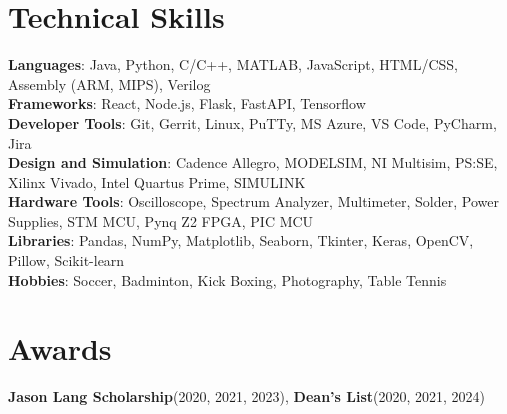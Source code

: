 \documentclass[A4,10pt]{article}
\newcommand{\resumeItem}[1]{
  \item\small{
    {#1 \vspace{-2pt}}
  }
}
\newcommand{\resumeItemListStart}{\begin{itemize}}
\newcommand{\resumeItemListEnd}{\end{itemize}\vspace{-5pt}}
\begin{document}
\section{Technical Skills}
 \begin{itemize}[leftmargin=0.15in, label={}]
    \small{\item{
     \textbf{Languages}{: Java, Python, C/C++, MATLAB, JavaScript, HTML/CSS, Assembly (ARM, MIPS), Verilog} \\
     \textbf{Frameworks}{: React, Node.js, Flask, FastAPI, Tensorflow} \\
     \textbf{Developer Tools}{: Git, Gerrit, Linux, PuTTy, MS Azure, VS Code, PyCharm, Jira} \\
     \textbf{Design and Simulation}{: Cadence Allegro, MODELSIM, NI Multisim, PS:SE, Xilinx Vivado, Intel Quartus Prime, SIMULINK}\\
     \textbf{Hardware Tools}{: Oscilloscope, Spectrum Analyzer, Multimeter, Solder, Power Supplies, STM MCU, Pynq Z2 FPGA, PIC MCU}\\
     \textbf{Libraries}{: Pandas, NumPy, Matplotlib, Seaborn, Tkinter, Keras, OpenCV, Pillow, Scikit-learn}\\
     \textbf{Hobbies}{: Soccer, Badminton, Kick Boxing, Photography, Table Tennis}\\
    }}
 \end{itemize}

\section{Awards}
 \begin{itemize}[leftmargin=0.15in, label={}]
  \small{\item{
   \textbf{Jason Lang Scholarship}{(2020, 2021, 2023),} \textbf{Dean's List}{(2020, 2021, 2024)}
  }}
\end{itemize}

\end{document}

